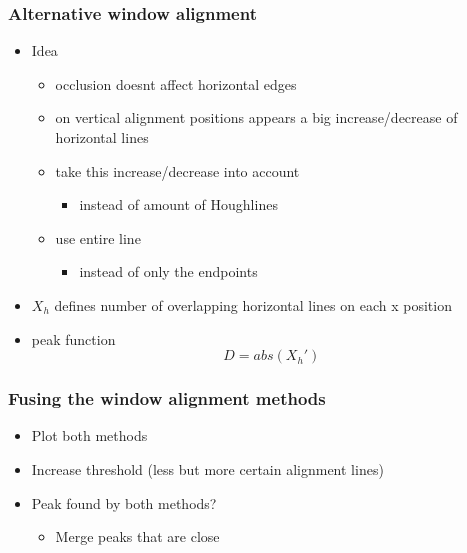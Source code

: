 \documentclass{beamer}
\begin{document}
\frame
{
	\frametitle{Alternative window alignment}
	\begin{itemize}
	\item <+-| alert@+> Idea
		\begin{itemize}
		\item <+-| alert@+> occlusion doesnt affect horizontal edges 
		\item <+-| alert@+> on vertical alignment positions appears a big increase/decrease of horizontal lines 
		\item <+-| alert@+> take this increase/decrease into account
			\begin{itemize}
			\item <+-| alert@+> instead of amount of Houghlines
			\end{itemize}
		\item <+-| alert@+> use entire line
			\begin{itemize}
			\item <+-| alert@+> instead of only the endpoints
			\end{itemize}
		\end{itemize}
	\item <+-| alert@+> $X_{h}$ defines number of overlapping horizontal lines on each x position
	\item <+-| alert@+> peak function \[D = abs( X_{h}')\]
	\end{itemize}
}

\frame
{
}




\frame
{
	\frametitle{Fusing the window alignment methods}
	\begin{itemize}
	\item <+-| alert@+> Plot both methods
	\item <+-| alert@+> Increase threshold (less but more certain alignment lines)
	\item <+-| alert@+> Peak found by both methods?
		\begin{itemize}
		\item <+-| alert@+> Merge peaks that are close
		\end{itemize}
	\end{itemize}
}
\end{document}
